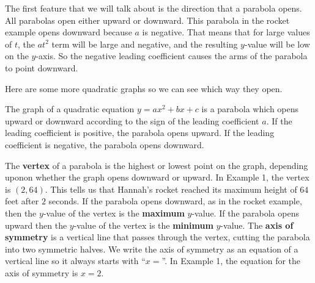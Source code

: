 \documentclass{ximera}
\begin{document}
 The first feature that we will talk about is the
      direction that a parabola opens.
      All parabolas open either upward or downward.
      This parabola in the rocket example opens downward because $a$ is negative.
      That means that for large values of $t$, the $at^2$ term will be large and negative,
      and the resulting $y$-value will be low on the $y$-axis.
      So the negative leading coefficient causes the arms of the parabola to point downward.
    

 Here are some more quadratic graphs so we can see which way they open.
\begin{image}
\end{image}
\begin{image}
\end{image}
\begin{image}
\end{image}
  The graph of a quadratic equation $y=ax^2+bx+c$ is a parabola which opens upward or downward
        according to the sign of the leading coefficient $a$.
        If the leading coefficient is positive,
        the parabola opens upward.
        If the leading coefficient is negative,
        the parabola opens downward.

 The \textbf{vertex}
      of a parabola is the highest or lowest point on the graph,
      depending uponon whether the graph opens downward or upward.
      In Example 1, the vertex is $(2,64)$.
      This tells us that Hannah's rocket reached its maximum height of $64$ feet after $2$ seconds.
      If the parabola opens downward, as in the rocket example,
      then the $y$-value of the vertex is the \textbf{maximum} $y$-value.
      If the parabola opens upward then the $y$-value of the vertex is the \textbf{minimum} $y$-value.
      The \textbf{axis of symmetry}
      is a vertical line that passes through the vertex, cutting the parabola into two symmetric halves.
      We write the axis of symmetry as an equation of a vertical line so it always starts with ``$x=$''.
      In Example 1, the equation for the axis of symmetry is $x=2$.
  
\end{document}
